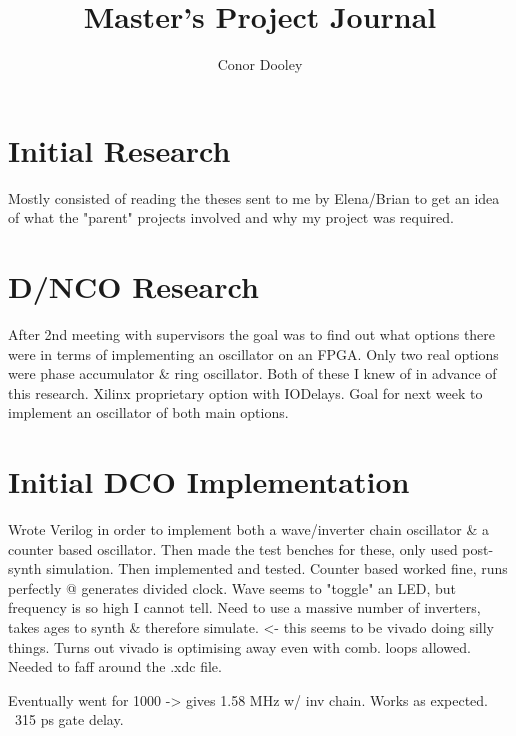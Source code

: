 \documentclass[a4paper,12pt]{report}
\begin{document}
\title{Master's Project Journal}
\author{Conor Dooley}
\maketitle
\section*{Initial Research}
Mostly consisted of reading the theses sent to me by Elena/Brian to get an idea of what the "parent" projects involved and why my project was required.
\section*{D/NCO Research}
After 2nd meeting with supervisors the goal was to find out what options there were in terms of implementing an oscillator on an FPGA. Only two real options were phase accumulator \& ring oscillator. Both of these I knew of in advance of this research. Xilinx proprietary option with IODelays. Goal for next week to implement an oscillator of both main options.
\section*{Initial DCO Implementation}
Wrote Verilog in order to implement both a wave/inverter chain oscillator \& a counter based oscillator. Then made the test benches for these, only used post-synth simulation. Then implemented and tested. Counter based worked fine, runs perfectly @ generates divided clock. Wave seems to "toggle" an LED, but frequency is so high I cannot tell. Need to use a massive number of inverters, takes ages to synth \& therefore simulate. <- this seems to be vivado doing silly things. Turns out vivado is optimising away even with comb. loops allowed. Needed to faff around the .xdc file.

Eventually went for 1000 -> gives 1.58 MHz w/ inv chain. Works as expected. ~315 ps gate delay.
\end{document}
